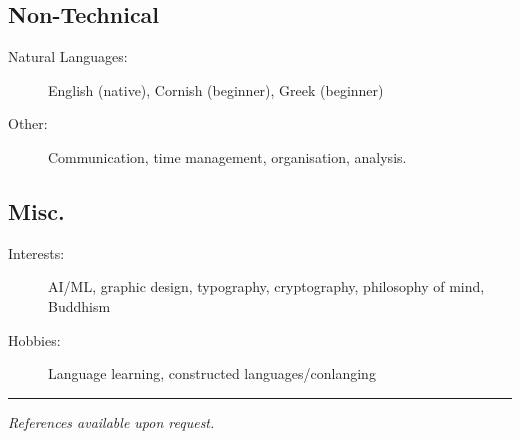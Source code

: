 \documentclass[10pt,a4paper]{article}
\newenvironment{indentsection}[1]%
{\begin{list}{}%
	{\setlength{\leftmargin}{#1}}%
	\item[]%
}
{\end{list}}
\begin{document}
\subsection*{Non-Technical}
\begin{indentsection}{\parindent}
\begin{description}
	\item[Natural Languages:]
	English (native), Cornish (beginner), Greek (beginner)
    \item[Other:]
    Communication, time management, organisation, analysis.
\end{description}
\end{indentsection}

\subsection*{Misc.}
\begin{indentsection}{\parindent}
\begin{description}
	\item[Interests:]
	AI/ML, graphic design, typography, cryptography, philosophy of mind, Buddhism
	\item[Hobbies:]
	Language learning, constructed languages/conlanging
\end{description}
\end{indentsection}

\vspace{1em}
\hrule
\vspace{2em}

\begin{center}
    \color{gray}\small\emph{References available upon request.}
\end{center}
\thispagestyle{empty}
\end{document}
